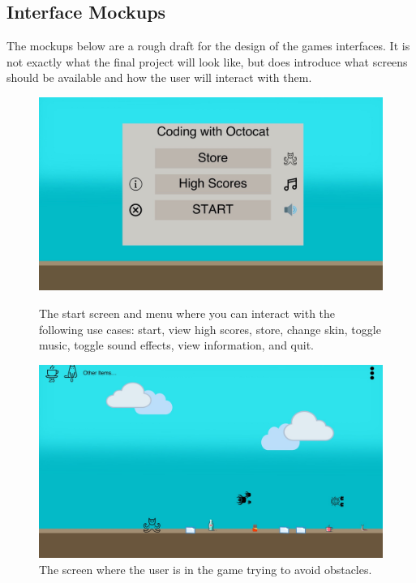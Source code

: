 \documentclass[10pt,conference,onecolumn,compsoc]{IEEEtran}
\begin{document}
\clearpage

\subsection{Interface Mockups}
The mockups below are a rough draft for the design of the games interfaces. It is not exactly what the final project will look like, but does introduce what screens should be available and how the user will interact with them.


\begin{figure}[h!]
\centering
\includegraphics[scale=.2]{MockupStartScreen.jpeg}
\caption{The start screen and menu where you can interact with the following use cases: start, view high scores, store, change skin, toggle music, toggle sound effects, view information, and quit.}

\includegraphics[scale=.2]{MockupIngame.jpeg}
\caption{The screen where the user is in the game trying to avoid obstacles. }
\end{figure}
\end{document}
